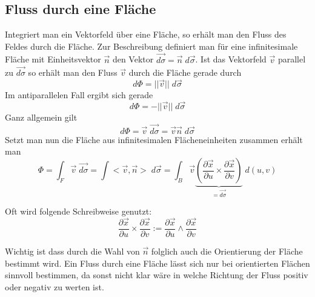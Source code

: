		\subsection{Fluss durch eine Fläche}
		Integriert man ein Vektorfeld über eine Fläche, so erhält man den Fluss des Feldes durch die Fläche. \newline
		Zur Beschreibung definiert man für eine infinitesimale Fläche mit Einheitsvektor $\vec{n}$ den Vektor $\vec{d \sigma} = \vec{n} \; d \vec{\sigma}$. Ist das Vektorfeld $\vec{v}$ parallel zu $\vec{d \sigma}$ so erhält man den Fluss $\vec{v}$ durch die Fläche gerade durch
		\begin{equation}
			d \Phi = ||\vec{v}|| \;d\vec{\sigma}
		\end{equation}
		Im antiparallelen Fall ergibt sich gerade
		\begin{equation}
			d\Phi = - ||\vec{v}|| \;d\vec{\sigma}
		\end{equation}
		Ganz allgemein gilt
		\begin{equation}
			d\Phi = \vec{v} \;\vec{d \sigma} = \vec{v} \vec{n} \;d\vec{\sigma}
		\end{equation}
		Setzt man nun die Fläche aus infinitesimalen Flächeneinheiten zusammen erhält man 
		\begin{equation}
			\Phi =  \int_F \vec{v}  \;\vec{d \sigma} = \int <\vec{v}, \vec{n}> \; d\vec{\sigma} = \int_B \vec{v}\underbrace{\left(\frac{\partial \vec{x}}{\partial u} \times \frac{\partial \vec{x}}{\partial v}\right)}_{= \vec{d\sigma}}\;d(u,v)
		\end{equation}
		
		\begin{bem}
			Oft wird folgende Schreibweise genutzt:
			\begin{equation}
				\frac{\partial \vec{x}}{\partial u} \times \frac{\partial \vec{x}}{\partial v} := \frac{\partial \vec{x}}{\partial u} \wedge \frac{\partial \vec{x}}{\partial v}
			\end{equation}
		\end{bem}
		\begin{bem}
			Wichtig ist dass durch die Wahl von $\vec{n}$ folglich auch die Orientierung der Fläche bestimmt wird. Ein Fluss durch eine Fläche lässt sich nur bei orientierten Flächen sinnvoll bestimmen, da sonst nicht klar wäre in welche Richtung der Fluss positiv oder negativ zu werten ist.
		\end{bem}
		
		